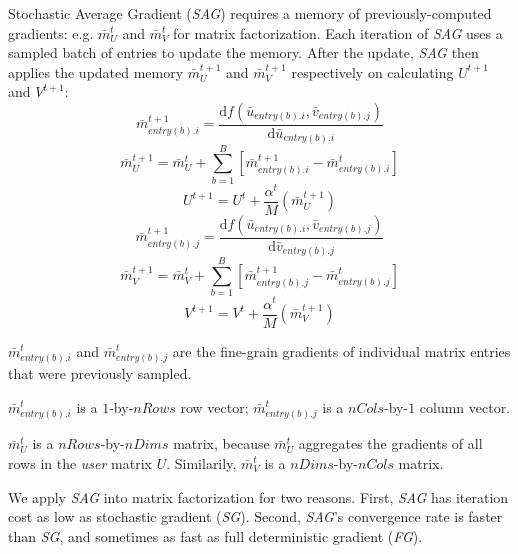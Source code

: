Stochastic Average Gradient (\emph{SAG}) requires a memory of previously-computed gradients: e.g. $\bar{m}_{U}^{t}$ and $\bar{m}_{V}^{t}$ for matrix factorization.
Each iteration of \emph{SAG} uses a sampled batch of entries to update the memory.
After the update, \emph{SAG} then applies the updated memory $\bar{m}_{U}^{t+1}$ and $\bar{m}_{V}^{t+1}$ respectively on calculating $U^{t+1}$ and $V^{t+1}$:
\begin{equation} \label{eq:sag_mi}
  \bar{m}_{entry(b).i}^{t+1} = \frac{\text{d}f(\bar{u}_{entry(b).i}, \bar{v}_{entry(b).j})}{\text{d}\bar{u}_{entry(b).i}}
\end{equation}
\begin{equation} \label{eq:sag_mu}
  \bar{m}_{U}^{t+1} = \bar{m}_{U}^{t} + \sum_{b=1}^{B}\left[\bar{m}_{entry(b).i}^{t+1} - \bar{m}_{entry(b).i}^{t}\right]
\end{equation}
\begin{equation} \label{eq:sag_ut}
  U^{t+1} = U^{t} + \frac{\alpha^{t}}{M}\left(\bar{m}_{U}^{t+1}\right)
\end{equation}
\begin{equation} \label{eq:sag_mj}
  \bar{m}_{entry(b).j}^{t+1} = \frac{\text{d}f(\bar{u}_{entry(b).i}, \bar{v}_{entry(b).j})}{\text{d}\bar{v}_{entry(b).j}}
\end{equation}
\begin{equation} \label{eq:sag_mv}
\bar{m}_{V}^{t+1} = \bar{m}_{V}^{t} + \sum_{b=1}^{B}\left[\bar{m}_{entry(b).j}^{t+1} - \bar{m}_{entry(b).j}^{t}\right]
\end{equation}
\begin{equation} \label{eq:sag_vt}
  V^{t+1} = V^{t} + \frac{\alpha^{t}}{M}\left(\bar{m}_{V}^{t+1}\right)
\end{equation}

$\bar{m}_{entry(b).i}^{t}$ and $\bar{m}_{entry(b).j}^{t}$ are the fine-grain gradients of individual matrix entries that were previously sampled.  

$\bar{m}_{entry(b).i}^{t}$ is a $1$-by-$nRows$ row vector;
$\bar{m}_{entry(b).j}^{t}$ is a $nCols$-by-$1$ column vector.

$\bar{m}_{U}^{t}$ is a $nRows$-by-$nDims$ matrix, because $\bar{m}_{U}^{t}$ aggregates the gradients of all rows in the \emph{user} matrix $U$.
Similarily, $\bar{m}_{V}^{t}$ is a $nDims$-by-$nCols$ matrix.

We apply \emph{SAG} into matrix factorization for two reasons.  
First, \emph{SAG} has iteration cost as low as stochastic gradient (\emph{SG}).
Second, \emph{SAG}'s convergence rate is faster than \emph{SG}, and sometimes as fast as full deterministic gradient (\emph{FG}).

